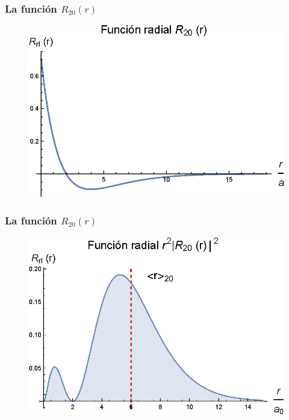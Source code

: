 \documentclass[12pt]{beamer}
\begin{document}
\begin{frame}
\frametitle{La función $R_{20} (r)$}
\begin{figure}
   \centering
   \includegraphics[scale=1]{Imagenes/Plot_Funcion_Radial_Hidrogeno_20_01.eps}
\end{figure}
\end{frame}
\begin{frame}
\frametitle{La función $R_{20} (r)$}
\begin{figure}
   \centering
   \includegraphics[scale=1]{Imagenes/Plot_Funcion_Radial_Hidrogeno_20_02.eps}
\end{figure}
\end{frame}
\end{document}

